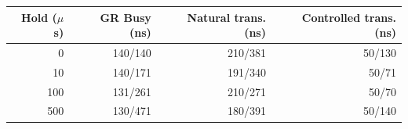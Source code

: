 \begin{tabular}{rrrr}
\toprule
Hold ($\mu$s) & GR Busy (ns) & Natural trans. (ns) & Controlled trans. (ns) \\
\midrule
0 & 140/140 & 210/381 & 50/130 \\
10 & 140/171 & 191/340 & 50/71 \\
100 & 131/261 & 210/271 & 50/70 \\
500 & 130/471 & 180/391 & 50/140 \\
\bottomrule
\end{tabular}
